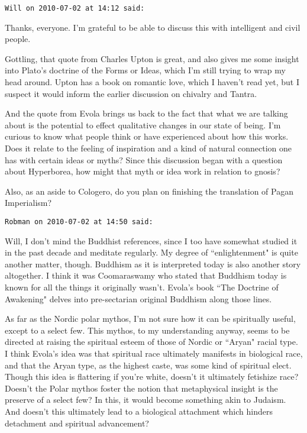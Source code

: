 \begin{footnotesize}
\begin{sffamily}
\hfill

\texttt{Will on 2010-07-02 at 14:12 said: }

Thanks, everyone. I'm grateful to be able to discuss this with intelligent and civil people.

Gottling, that quote from Charles Upton is great, and also gives me some insight into Plato's doctrine of the Forms or Ideas, which I'm still trying to wrap my head around. Upton has a book on romantic love, which I haven't read yet, but I suspect it would inform the earlier discussion on chivalry and Tantra.

And the quote from Evola brings us back to the fact that what we are talking about is the potential to effect qualitative changes in our state of being. I'm curious to know what people think or have experienced about how this works. Does it relate to the feeling of inspiration and a kind of natural connection one has with certain ideas or myths? Since this discussion began with a question about Hyperborea, how might that myth or idea work in relation to gnosis?

Also, as an aside to Cologero, do you plan on finishing the translation of Pagan Imperialism?


\hfill

\texttt{Robman on 2010-07-02 at 14:50 said: }

Will, I don't mind the Buddhist references, since I too have somewhat studied it in the past decade and meditate regularly. My degree of ``enlightenment" is quite another matter, though. Buddhism as it is interpreted today is also another story altogether. I think it was Coomaraswamy who stated that Buddhism today is known for all the things it originally wasn't. Evola's book ``The Doctrine of Awakening" delves into pre-sectarian original Buddhism along those lines.

As far as the Nordic polar mythos, I'm not sure how it can be spiritually useful, except to a select few. This mythos, to my understanding anyway, seems to be directed at raising the spiritual esteem of those of Nordic or ``Aryan" racial type. I think Evola's idea was that spiritual race ultimately manifests in biological race, and that the Aryan type, as the highest caste, was some kind of spiritual elect. Though this idea is flattering if you're white, doesn't it ultimately fetishize race? Doesn't the Polar mythos foster the notion that metaphysical insight is the preserve of a select few? In this, it would become something akin to Judaism. And doesn't this ultimately lead to a biological attachment which hinders detachment and spiritual advancement?



\end{sffamily}
\end{footnotesize}

